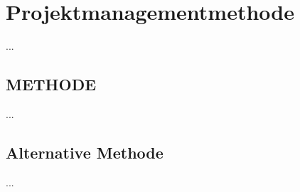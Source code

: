 \chapter{Projektmanagementmethode}\label{ch:projektmanagementmethode}
...

\section{METHODE}\label{sec:METHODE}
...


\section{Alternative Methode}\label{sec:alternative-methode}
...
